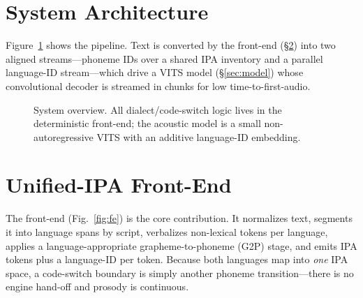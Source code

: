 \documentclass[10pt,twocolumn]{article}
\newcommand{\ar}[1]{\textarabic{#1}}        %
\begin{document}
\section{System Architecture}
Figure~\ref{fig:arch} shows the pipeline. Text is converted by the front-end
(\S\ref{sec:frontend}) into two aligned streams---phoneme IDs over a shared IPA
inventory and a parallel language-ID stream---which drive a VITS model
(\S\ref{sec:model}) whose convolutional decoder is streamed in chunks for low
time-to-first-audio.

\begin{figure}[t]\centering
{}
\caption{System overview. All dialect/code-switch logic lives in the deterministic
front-end; the acoustic model is a small non-autoregressive VITS with an additive
language-ID embedding.}
\label{fig:arch}
\end{figure}

\section{Unified-IPA Front-End}\label{sec:frontend}
The front-end (Fig.~\ref{fig:fe}) is the core contribution. It normalizes text, segments
it into language spans by script, verbalizes non-lexical tokens per language, applies a
language-appropriate grapheme-to-phoneme (G2P) stage, and emits IPA tokens plus a
language-ID per token. Because both languages map into \emph{one} IPA space, a code-switch
boundary is simply another phoneme transition---there is no engine hand-off and prosody is
continuous.
\end{document}
